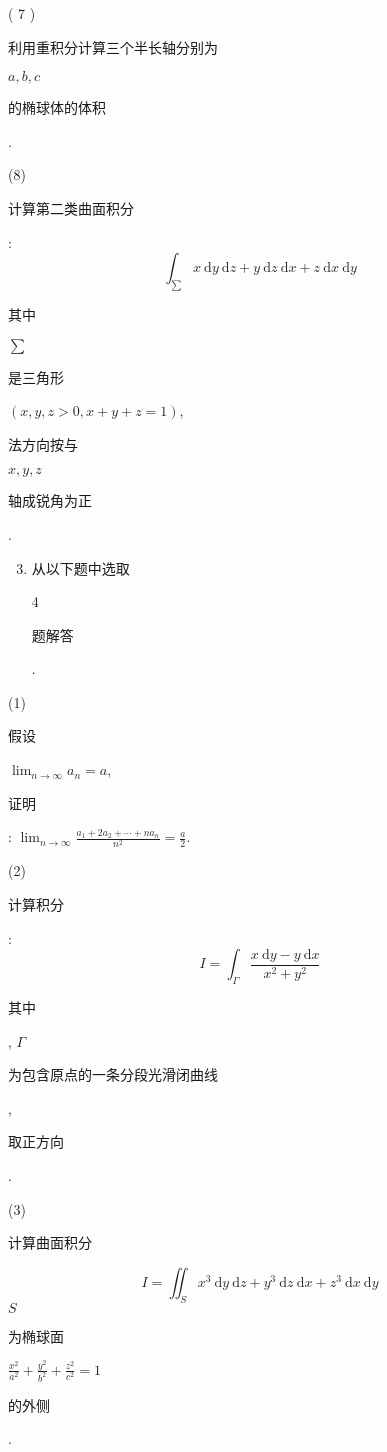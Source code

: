 \documentclass[10pt]{article}
\begin{document}
( 7 ) \begin{CJK}{UTF8}{mj}利用重积分计算三个半长轴分别为\end{CJK} $a, b, c$ \begin{CJK}{UTF8}{mj}的椭球体的体积\end{CJK}.

(8) \begin{CJK}{UTF8}{mj}计算第二类曲面积分\end{CJK}:
$$
\int_{\sum} x \mathrm{~d} y \mathrm{~d} z+y \mathrm{~d} z \mathrm{~d} x+z \mathrm{~d} x \mathrm{~d} y
$$
\begin{CJK}{UTF8}{mj}其中\end{CJK} $\sum$ \begin{CJK}{UTF8}{mj}是三角形\end{CJK} $(x, y, z>0, x+y+z=1)$, \begin{CJK}{UTF8}{mj}法方向按与\end{CJK} $x, y, z$ \begin{CJK}{UTF8}{mj}轴成锐角为正\end{CJK}.

\begin{enumerate}
  \setcounter{enumi}{2}
  \item \begin{CJK}{UTF8}{mj}从以下题中选取\end{CJK} 4 \begin{CJK}{UTF8}{mj}题解答\end{CJK}.
\end{enumerate}
(1) \begin{CJK}{UTF8}{mj}假设\end{CJK} $\lim _{n \rightarrow \infty} a_{n}=a$, \begin{CJK}{UTF8}{mj}证明\end{CJK}: $\lim _{n \rightarrow \infty} \frac{a_{1}+2 a_{2}+\cdots+n a_{n}}{n^{2}}=\frac{a}{2}$.

(2) \begin{CJK}{UTF8}{mj}计算积分\end{CJK}:
$$
I=\int_{\Gamma} \frac{x \mathrm{~d} y-y \mathrm{~d} x}{x^{2}+y^{2}}
$$
\begin{CJK}{UTF8}{mj}其中\end{CJK}, $\Gamma$ \begin{CJK}{UTF8}{mj}为包含原点的一条分段光滑闭曲线\end{CJK}, \begin{CJK}{UTF8}{mj}取正方向\end{CJK}.

(3) \begin{CJK}{UTF8}{mj}计算曲面积分\end{CJK}
$$
I=\iint_{S} x^{3} \mathrm{~d} y \mathrm{~d} z+y^{3} \mathrm{~d} z \mathrm{~d} x+z^{3} \mathrm{~d} x \mathrm{~d} y
$$
$S$ \begin{CJK}{UTF8}{mj}为椭球面\end{CJK} $\frac{x^{2}}{a^{2}}+\frac{y^{2}}{b^{2}}+\frac{z^{2}}{c^{2}}=1$ \begin{CJK}{UTF8}{mj}的外侧\end{CJK}.
\end{document}
